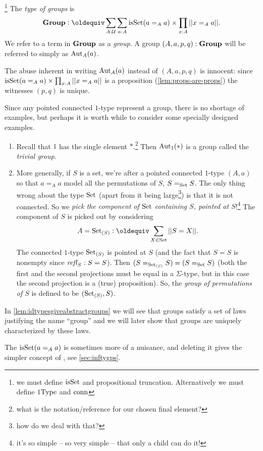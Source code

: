 \begin{definition}\label{def:typegroup}\footnote{we must define  $\mathrm{isSet}$ and propositional truncation.  Alternatively we must define $\mathrm{1Type}$ and $\mathrm{conn}$}
  The \emph{type of groups} is
$$\typegroup\defequi\sum_{A:\mathcal U}\sum_{a:A}\isset(a=_Aa)\times\prod_{x:A}||x=_Aa||.$$
We refer to a term in $\mathbf{Group}$ as a \emph{group}.  A group $(A,a,p,q):\mathbf{Group}$ will be referred to simply as $\mathrm{Aut}_A(a)$.
\end{definition}
\begin{remark}\label{rem:aut}
The abuse inherent in writing $\mathrm{Aut}_A(a)$ instead of $(A,a,p,q)$ is innocent: since $\mathrm{isSet}(a=_Aa)\times\prod_{x:A}||x=_Aa||$ is a proposition  (\cref{lem:props-are-props}) the witnesses $(p,q)$  is unique.
\end{remark}
\begin{example}
  Since any pointed connected $1$-type represent a group, there is no shortage of examples, but perhaps it is worth while to consider some specially designed examples.
  \begin{enumerate}
  \item Recall that $1$ has the single element $*$.\footnote{what is the notation/reference for our chosen final element?} Then $\mathrm{Aut}_1(*)$ is a group called the \emph{trivial group}.
  \item More generally, if $S$ is a set, we're after a pointed connected $1$-type $(A,a)$ so that $a=_Aa$ model all the permutations of $S$, \ie $S=_{\mathord{\mathrm{Set}}}S$.  The only thing wrong about the type $\mathord{\mathrm{Set}}$ (apart from it being large\footnote{how do we deal with that?}) is that it is not connected.  So we \emph{pick
 the component of $\mathord{\mathrm{Set}}$ containing $S$, pointed at $S$}!\footnote{it's so simple -- so very simple -- that only a child can do it!}  The component of $S$ is picked out by considering
$$A=\Set_{(S)}\defequi\sum_{X\in\Set}||S=X||.$$  The connected $1$-type $\mathord{\mathrm{Set}}_{(S)}$ is pointed at $S$ (and the fact that $S=S$ is nonempty since $\mathop{{\it refl}_{S}}:S=S$).    Then $(S=_{\mathord{\mathrm{Set}}_{(S)}}S)=(S=_{\mathord{\mathrm{Set}}}S)$ (both the first and the second projections must be equal in a $\Sigma$-type, but in this case the second projection is a (true) proposition).  So, the \emph{group of permutations of $S$} is defined to be $(\mathord{\mathrm{Set}}_{(S)},S)$.
  \end{enumerate}
\end{example}

\begin{remark}
In \cref{lem:idtypesgiveabstractgroups} we will see that groups satisfy a set of laws justifying the name ``group''
and we will later show that groups are uniquely characterized by these laws.
\end{remark}
\begin{remark}
  The $\mathrm{isSet}(a=_Aa)$ is sometimes more of a nuisance, and deleting it gives the simpler concept of \aninftygp, see \cref{sec:inftygps}.
\end{remark}

